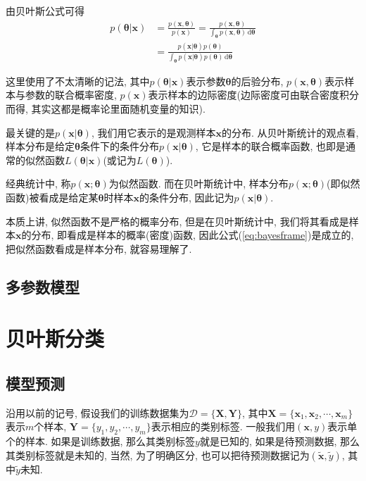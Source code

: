 \documentclass[a4paper,UTF8]{ctexart}
\theoremstyle{plain} \newtheorem{theorem}{定理}[section]
\theoremstyle{plain} \newtheorem{definition}{定义}[section]
\theoremstyle{plain} \newtheorem{lemma}{引理}[section]
\theoremstyle{plain} \newtheorem{proposition}{命题}[section]
\theoremstyle{plain} \newtheorem{example}{例}[section]
\theoremstyle{plain} \newtheorem{remark}{注}[section]
\theoremstyle{plain} \newtheorem{corollary}{推论}[section]
\newcommand\diff{\,{\mathrm d}} %
\begin{document}
由贝叶斯公式可得
\begin{equation}\label{eq:bayesframe}
\begin{split}
p(\bm{\theta} | \bm{x}) & = \frac{p(\bm{x}, \bm{\theta})}{p(\bm{x})} = \frac{p(\bm{x}, \bm{\theta})}{\displaystyle \int_{\bm{\theta}} p(\bm{x}, \bm{\theta}) \diff \bm{\theta}} \\ 
& = \frac{p(\bm{x} | \bm{\theta}) p(\bm{\theta})}{\displaystyle \int_{\bm{\theta}} p(\bm{x} | \bm{\theta}) p(\bm{\theta})  \diff \bm{\theta}}
\end{split}
\end{equation}

这里使用了不太清晰的记法, 其中$p(\bm{\theta} | \bm{x})$表示参数$\bm{\theta}$的后验分布, $p(\bm{x}, \bm{\theta})$表示样本与参数的联合概率密度, $p(\bm{x})$表示样本的边际密度(边际密度可由联合密度积分而得, 其实这都是概率论里面随机变量的知识).

最关键的是$p(\bm{x} | \bm{\theta})$, 我们用它表示的是观测样本$\bm{x}$的分布. 从贝叶斯统计的观点看, 样本分布是给定$\bm{\theta}$条件下的条件分布$p(\bm{x} | \bm{\theta})$, 它是样本的联合概率函数, 也即是通常的似然函数$L(\bm{\theta} | \bm{x})$(或记为$L(\bm{\theta})$).

经典统计中, 称$p(\bm{x}; \bm{\theta})$为似然函数. 而在贝叶斯统计中, 样本分布$p(\bm{x}; \bm{\theta})$(即似然函数)被看成是给定某$\bm{\theta}$时样本$\bm{x}$的条件分布, 因此记为$p(\bm{x} | \bm{\theta})$.

本质上讲, 似然函数不是严格的概率分布, 但是在贝叶斯统计中, 我们将其看成是样本$\bm{x}$的分布, 即看成是样本的概率(密度)函数, 因此公式(\ref{eq:bayesframe})是成立的, 把似然函数看成是样本分布, 就容易理解了.



\subsection{多参数模型}


\section{贝叶斯分类}
\subsection{模型预测}
沿用以前的记号, 假设我们的训练数据集为$\mathcal{D} = \{\bm{X}, \bm{Y}\}$, 其中$\bm{X} = \{ \bm{x}_1, \bm{x}_2, \cdots, \bm{x}_m \}$表示$m$个样本, $\bm{Y} = \{y_1, y_2, \cdots, y_m\}$表示相应的类别标签. 一般我们用$(\bm{x}, y)$表示单个的样本. 如果是训练数据, 那么其类别标签$y$就是已知的, 如果是待预测数据, 那么其类别标签就是未知的, 当然, 为了明确区分, 也可以把待预测数据记为$(\tilde{\bm{x}}, \tilde{y})$, 其中$\tilde{y}$未知.
\end{document}
